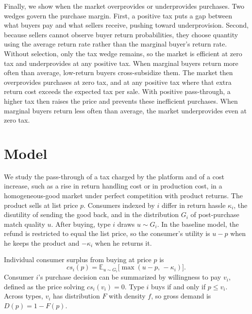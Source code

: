\documentclass[11pt]{article}
\begin{document}
Finally, we show when the market overprovides or underprovides purchases. Two
wedges govern the purchase margin. First, a positive tax puts a gap between
what buyers pay and what sellers receive, pushing toward underprovision.
Second, because sellers cannot observe buyer return probabilities, they choose
quantity using the average return rate rather than the marginal buyer's return
rate. Without selection, only the tax wedge remains, so the market is efficient
at zero tax and underprovides at any positive tax. When marginal buyers return
more often than average, low-return buyers cross-subsidize them. The market
then overprovides purchases at zero tax, and at any positive tax where that
extra return cost exceeds the expected tax per sale. With positive
pass-through, a higher tax then raises the price and prevents these
inefficient purchases. When marginal buyers
return less often than average, the market underprovides even at zero tax.

\section{Model}

We study the pass-through of a tax charged by the platform and of a
cost increase, such as a rise in return handling cost or in production
cost, in a homogeneous-good market under perfect competition with
product returns. The product sells at list price $p$. Consumers indexed by $i$ differ in
return hassle $\kappa_i$, the disutility of sending the good back, and in
the distribution $G_i$ of post-purchase match quality $u$. After buying,
type $i$ draws $u\sim G_i$. In the baseline model, the refund is restricted
to equal the list price, so the consumer's utility is $u-p$ when he keeps
the product and $-\kappa_i$ when he returns it.

Individual consumer surplus from buying at price $p$ is
\[
  cs_i(p)=\mathbb{E}_{u\sim G_i}\bigl[\max(u-p,\,-\kappa_i)\bigr].
\]
Consumer $i$'s purchase decision can be summarized by willingness to pay
$v_i$, defined as the price solving $cs_i(v_i)=0$. Type $i$ buys if and
only if $p\leq v_i$. Across types, $v_i$ has distribution $F$ with density
$f$, so gross demand is $D(p)=1-F(p)$.
\end{document}
